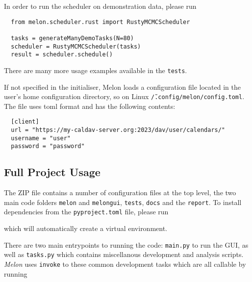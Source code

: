 In order to run the scheduler on demonstration data, please run
\begin{verbatim}
  from melon.scheduler.rust import RustyMCMCScheduler

  tasks = generateManyDemoTasks(N=80)
  scheduler = RustyMCMCScheduler(tasks)
  result = scheduler.schedule()
\end{verbatim}

There are many more usage examples available in the \texttt{tests}.

If not specified in the initialiser, Melon loads a configuration file located in the user's home configuration directory, so on Linux \texttt{\~/.config/melon/config.toml}.
The file uses \gls{toml} format and has the following contents:
\begin{verbatim}
  [client]
  url = "https://my-caldav-server.org:2023/dav/user/calendars/"
  username = "user"
  password = "password"
\end{verbatim}

\subsection{Full Project Usage}
The ZIP file contains a number of configuration files at the top level, the two main code folders \texttt{melon} and \texttt{melongui}, \texttt{tests}, \texttt{docs} and the \texttt{report}.
To install dependencies from the \texttt{pyproject.toml} file, please run


which will automatically create a virtual environment.

There are two main entrypoints to running the code: \texttt{main.py} to run the GUI, as well as \texttt{tasks.py} which contains miscellanous development and analysis scripts. \textit{Melon} uses \texttt{invoke} to these common development tasks which are all callable by running


